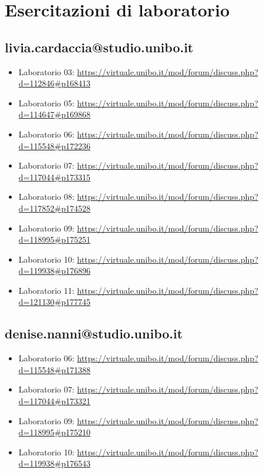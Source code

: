 \documentclass[a4paper,12pt]{report}
\begin{document}
\chapter{Esercitazioni di laboratorio}
\section{livia.cardaccia@studio.unibo.it}
\begin{itemize}
\item Laboratorio 03: \url{https://virtuale.unibo.it/mod/forum/discuss.php?d=112846\#p168413}
\item Laboratorio 05: \url{https://virtuale.unibo.it/mod/forum/discuss.php?d=114647\#p169868}
\item Laboratorio 06: \url{https://virtuale.unibo.it/mod/forum/discuss.php?d=115548\#p172236}
\item Laboratorio 07: \url{https://virtuale.unibo.it/mod/forum/discuss.php?d=117044\#p173315}
\item Laboratorio 08: \url{https://virtuale.unibo.it/mod/forum/discuss.php?d=117852\#p174528}
\item Laboratorio 09: \url{https://virtuale.unibo.it/mod/forum/discuss.php?d=118995\#p175251}
\item Laboratorio 10: \url{https://virtuale.unibo.it/mod/forum/discuss.php?d=119938\#p176896}
\item Laboratorio 11: \url{https://virtuale.unibo.it/mod/forum/discuss.php?d=121130\#p177745}
\end{itemize}
\section{denise.nanni@studio.unibo.it}
\begin{itemize}
\item Laboratorio 06: \url{https://virtuale.unibo.it/mod/forum/discuss.php?d=115548\#p171388}
\item Laboratorio 07: \url{https://virtuale.unibo.it/mod/forum/discuss.php?d=117044\#p173321}
\item Laboratorio 09: \url{https://virtuale.unibo.it/mod/forum/discuss.php?d=118995\#p175210}
\item Laboratorio 10: \url{https://virtuale.unibo.it/mod/forum/discuss.php?d=119938\#p176543}
\end{itemize}
\end{document}
